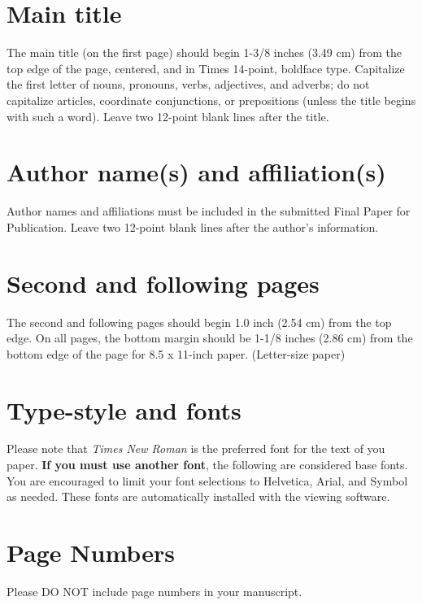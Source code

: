 \documentclass[10pt]{article}
\begin{document}
\section{Main title}

The main title (on the first page) should begin 1-3/8 inches (3.49 cm) from the top edge of the page, centered, and in Times 14-point, boldface type. Capitalize the first letter of nouns, pronouns, verbs, adjectives, and adverbs; do not capitalize articles, coordinate conjunctions, or prepositions (unless the title begins with such a word). Leave two 12-point blank lines after the title.

\section{Author name(s) and affiliation(s) }

Author names and affiliations must be included in the submitted Final Paper for Publication. Leave two 12-point blank lines after the author’s information. 

\section{Second and following pages}
\label{sect:pdf}

The second and following pages should begin 1.0 inch (2.54 cm) from the top edge. On all pages, the bottom margin should be 1-1/8 inches (2.86 cm) from the bottom edge of the page for 8.5 x 11-inch paper. (Letter-size paper)

\section{Type-style and fonts}
\label{sec:type-style}

Please note that {\em Times New Roman} is the preferred font for the text of you paper. \textbf{If you must use another font}, the following are considered base fonts.  You are encouraged to limit your font selections to Helvetica, Arial, and Symbol as needed. These fonts are automatically installed with the viewing software. 

\section{Page Numbers}

Please DO NOT include page numbers in your manuscript.

 
\end{document}
